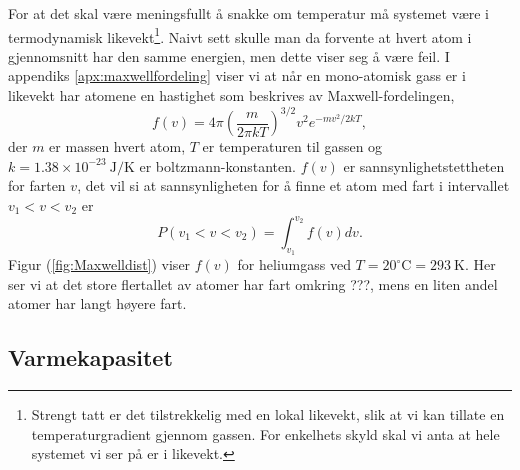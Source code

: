 For at det skal være meningsfullt å snakke om temperatur må systemet være i termodynamisk likevekt\footnote{Strengt tatt er det tilstrekkelig med en lokal likevekt, slik at vi kan tillate en temperaturgradient gjennom gassen. For enkelhets skyld skal vi anta at hele systemet vi ser på er i likevekt.}. Naivt sett skulle man da forvente at hvert atom i gjennomsnitt har den samme energien, men dette viser seg å være feil. I appendiks \ref{apx:maxwellfordeling} viser vi at når en mono-atomisk gass er i likevekt har atomene en hastighet som beskrives av Maxwell-fordelingen,
\begin{displaymath}
	f(v) = 4\pi\left( \frac{m}{2\pi kT} \right)^{3/2} v^2e^{-mv^2/2kT},
\end{displaymath}
der $m$ er massen hvert atom, $T$ er temperaturen til gassen og $k = 1.38\times10^{-23}~\mathrm{J/K}$ er boltzmann-konstanten. $f(v)$ er sannsynlighetstettheten for farten $v$, det vil si at sannsynligheten for å finne et atom med fart i intervallet $v_1<v<v_2$ er
\begin{displaymath}
	P(v_1 < v < v_2) = \int_{v_1}^{v_2} f(v) dv.
\end{displaymath}
Figur (\ref{fig:Maxwelldist}) viser $f(v)$ for heliumgass ved $T=20^\circ\mathrm{C} = 293~\mathrm{K}$. Her ser vi at det store flertallet av atomer har fart omkring ???, mens en liten andel atomer har langt høyere fart. 


\subsection{Varmekapasitet}



